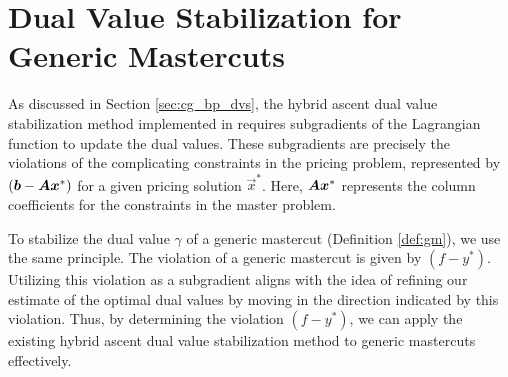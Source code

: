 \section{Dual Value Stabilization for Generic Mastercuts}\label{sec:gm_dvs}
As discussed in Section \ref{sec:cg_bp_dvs}, the hybrid ascent dual value stabilization method implemented in \GCG{} requires subgradients of the Lagrangian function to update the dual values. These subgradients are precisely the violations of the complicating constraints in the pricing problem, represented by $\left( {\bm{b}} - {\bm{A}} {\bm{x}}^* \right)$ for a given pricing solution $\vec{x}^*$. Here, ${\bm{A}} {\bm{x}}^*$ represents the column coefficients for the constraints in the master problem.

To stabilize the dual value $\gamma$ of a generic mastercut (Definition \ref{def:gm}), we use the same principle. The violation of a generic mastercut is given by $\left( f - y^* \right)$. Utilizing this violation as a subgradient aligns with the idea of refining our estimate of the optimal dual values by moving in the direction indicated by this violation. Thus, by determining the violation $\left( f - y^* \right)$, we can apply the existing hybrid ascent dual value stabilization method to generic mastercuts effectively.
